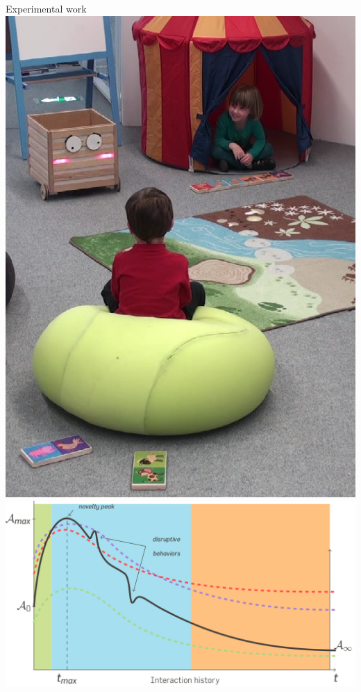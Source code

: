 \documentclass[compress]{beamer}
\begin{document}
\begin{frame}{Experimental work}
            \hyperlink{dominos}{\includegraphics[height=0.2\paperheight]{ranger/domino-mistake}}
            \hspace{0.5em}
            \hyperlink{anthropomorphism}{\includegraphics[height=0.2\paperheight]{dynamics_anthropo}}


\end{frame}
\end{document}
